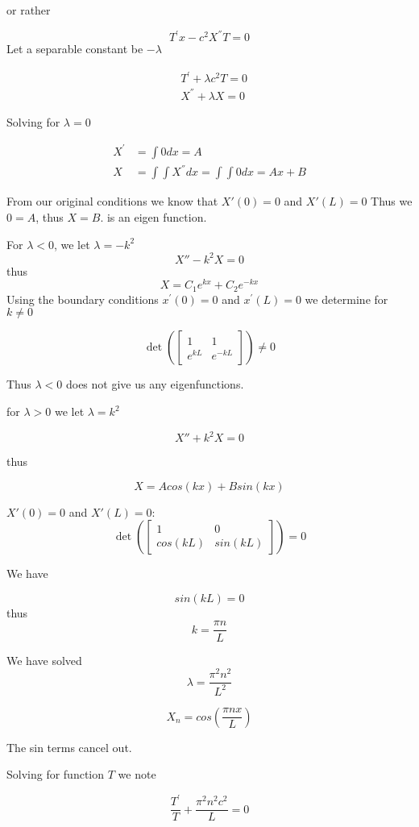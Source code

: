 \documentclass{article}
\begin{document}
or rather

$$
T^{'}x - c^2X^{''}T=0
$$
Let a separable constant be $-\lambda$

\begin{align*}
&T^{'} + \lambda c^2 T =0 \\
&X^{''} + \lambda X=0
\end{align*}

Solving for $\lambda=0$

\begin{align*}
X^{'} &= \int 0 dx =  A \\
X &= \int \int X^{''} dx = \int \int 0 dx = Ax+B
\end{align*}

From our original conditions we know that $X'(0) =0$ and $X'(L)=0$
Thus we $0=A$, thus $X=B$. is an eigen function. 


For $\lambda <0$, we let $\lambda = -k^2$
$$
X''-k^2X=0
$$
thus
$$X = C_1e^{kx} + C_2e^{-kx}$$
Using the boundary conditions $x^{'}(0)=0$ and $x^{'}(L)=0$ we determine for $k \neq 0$

$$\det \left( \begin{bmatrix} 1 & 1 \\ e^{kL} & e^{-kL} \end{bmatrix} \right) \neq 0$$

Thus $\lambda <0$ does not give us any eigenfunctions.

for $\lambda > 0$ we let $\lambda = k^2$

$$ X''+k^2X=0$$

thus

$$X = Acos(kx)+Bsin(kx)$$

$X'(0)=0$ and $X'(L)=0$:
$$\det \left( \begin{bmatrix} 1 & 0 \\ cos(kL) & sin(kL) \end{bmatrix} \right) = 0$$

We have

$$sin(kL) =0$$ thus $$k=\frac{\pi n}{L}$$

We have solved $$ \lambda = \frac{\pi^2n^2}{L^2} $$

\begin{equation}\label{A}
X_n = cos(\frac{\pi n x}{L})
\end{equation}

The sin terms cancel out.

Solving for function $T$ we note

$$\frac{T^{'}}{T} + \frac{\pi^2n^2c^2}{L} = 0$$
\end{document}

